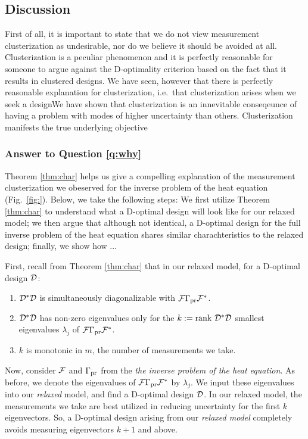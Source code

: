 \subsection{Discussion}
First of all, it is important to state that we do not view measurement
clusterization as undesirable, nor do we believe it should be avoided
at all. Clusterization is a peculiar phenomenon and it is perfectly
reasonable for someone to argue against the D-optimality criterion
based on the fact that it results in clustered designs. We have seen,
however that there is perfectly reasonable explanation for
clusterization, i.e.~that clusterization arises when we seek a
designWe have shown that clusterization is an innevitable conseqeunce
of having a problem with modes of higher uncertainty than
others. Clusterization manifests the true underlying objective


\subsubsection{Answer to Question \ref{q:why}}
Theorem \ref{thm:char} helps us give a compelling explanation of the
measurement clusterization we obeserved for the inverse problem of the
heat equation (Fig.~\ref{fig:}). Below, we take the following steps:
We first utilize Theorem \ref{thm:char} to understand what a D-optimal
design will look like for our relaxed model; we then argue that
although not identical, a D-optimal design for the full inverse
problem of the heat equation shares similar charachteristics to the
relaxed design; finally, we show how ...

First, recall from Theorem \ref{thm:char} that in our relaxed model,
for a D-optimal design $\mathcal{D}$:
\begin{enumerate}
  \item $\mathcal{D}^*\mathcal{D}$ is simultaneously diagonalizable with $\mathcal{F}
    \Gamma_{\textup{pr}} \mathcal{F}^*$.
  \item $\mathcal{D}^*\mathcal{D}$ has non-zero eigenvalues only for the $k:=\textup{rank}\ 
    \mathcal{D}^*\mathcal{D}$ smallest eigenvalues $\lambda_j$ of
    $\mathcal{F}\Gamma_{\textup{pr}}\mathcal{F}^*$.
  \item $k$ is monotonic in $m$, the number of measurements we take.
\end{enumerate}

Now, consider $\mathcal{F}$ and $\Gamma_{\textup{pr}}$ from the \emph{the inverse problem
of the heat equation}. As before, we denote the eigenvalues of
$\mathcal{F}\Gamma_{\textup{pr}}\mathcal{F}^*$ by $\lambda_j$. We input these eigenvalues into our
\emph{relaxed} model, and find a D-optimal design $\mathcal{D}$. In our
relaxed model, the measurements we take are best utilized in reducing
uncertainty for the first $k$ eigenvectors. So, a D-optimal design
arising from our \emph{relaxed model} completely avoids measuring
eigenvectors $k+1$ and above.

